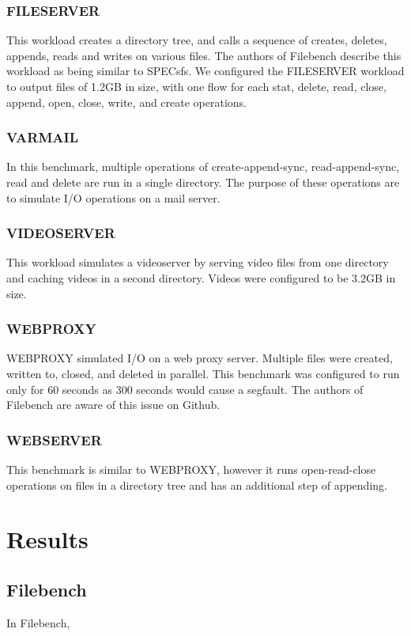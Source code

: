 \documentclass[letterpaper,twocolumn,10pt]{article}
\begin{document}
\subsubsection{FILESERVER}
This workload creates a directory tree, and calls a sequence of creates, deletes, appends, reads and writes on various files. The authors of Filebench describe this workload as being similar to SPECsfs. We configured the FILESERVER workload to output files of 1.2GB in size, with one flow for each stat, delete, read, close, append, open, close, write, and create operations.

\subsubsection{VARMAIL}
In this benchmark, multiple operations of create-append-sync, read-append-sync, read and delete are run in a single directory. The purpose of these operations are to simulate I/O operations on a mail server. 

\subsubsection{VIDEOSERVER}
This workload simulates a videoserver by serving video files from one directory and caching videos in a second directory. Videos were configured to be 3.2GB in size.

\subsubsection{WEBPROXY}
WEBPROXY simulated I/O on a web proxy server. Multiple files were created, written to, closed, and deleted in parallel. This benchmark was configured to run only for 60 seconds as 300 seconds would cause a segfault. The authors of Filebench are aware of this issue on Github.

\subsubsection{WEBSERVER}
This benchmark is similar to WEBPROXY, however it runs open-read-close operations on files in a directory tree and has an additional step of appending. 

\section{Results}
\subsection{Filebench}
In Filebench, 
\end{document}
